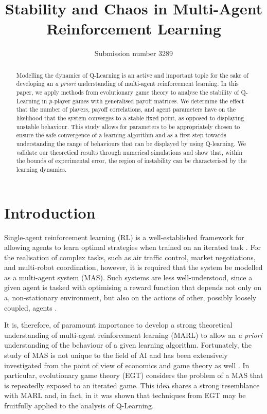 \documentclass{article}
\title{Stability and Chaos in Multi-Agent Reinforcement Learning}
\author{Submission number 3289
}
\begin{document}
\maketitle

\begin{abstract}

Modelling the dynamics of Q-Learning is an active and important topic for the sake of developing an \textit{a priori} understanding of multi-agent reinforcement learning. In this paper, we apply methods from evolutionary game theory to analyse the stability of Q-Learning in $p$-player games with generalised payoff matrices. We determine the effect that the number of players, payoff correlations, and agent parameters have on the likelihood that the system converges to a stable fixed point, as opposed to displaying unstable behaviour. 
%
This study allows for parameters to be appropriately chosen to ensure the safe convergence of a learning algorithm and as a first step towards understanding the range of behaviours that can be displayed by 
using Q-learning. We validate our theoretical results through numerical simulations and show that, within the bounds of experimental error, the region of instability can be characterised by the learning dynamics.

\end{abstract}

\section{Introduction}

\label{sec::Intro}

Single-agent reinforcement learning (RL) is a well-established
framework for allowing agents to learn optimal strategies when trained
on an iterated task \cite{Sutton2018}. For the realisation of complex tasks,
such as air traffic control, market negotiations, and multi-robot
coordination, however, it is required that the system be modelled as a
multi-agent system (MAS). Such systems are less well-understood, since a given agent is tasked with
optimising a reward function that depends not only on a,
non-stationary environment, but also on the actions of other, possibly
loosely coupled, agents \cite{schwartz:reinforcement}.

It is, therefore, of paramount importance to develop a strong
theoretical understanding of multi-agent reinforcement learning (MARL)
to allow an \textit{a priori} understanding of the behaviour of a given
learning algorithm. Fortunately, the study of MAS is not unique to the
field of AI and has been extensively investigated from the point of view of
economics and game theory as well
\cite{shoham_leyton-brown_2008,leslie:iql}. In particular,
evolutionary game theory (EGT) considers the problem of a MAS that is
repeatedly exposed to an iterated game. This idea shares a strong
resemblance with MARL and, in fact, in \cite{tuyls:iteratedgames} it was
shown that techniques from EGT may be fruitfully applied to the analysis of
Q-Learning.
\end{document}
